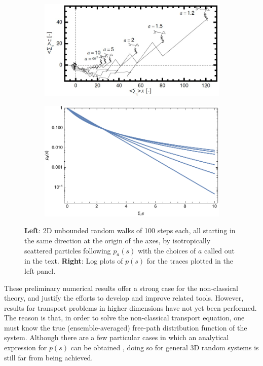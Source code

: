 \documentclass[12pt]{article}
\begin{document}
\begin{figure}[hbt]
    \centering
    \begin{subfigure}{0.49\textwidth}
        \centering
        \includegraphics[width=\textwidth]{fig4a.jpg}
    \end{subfigure}
        \begin{subfigure}{0.49\textwidth}
        \centering
        \includegraphics[width=\textwidth]{fig4b}
    \end{subfigure}
    \caption{\textbf{Left}: 2D unbounded random walks of 100 steps each, all starting in the same direction at the origin of the axes, by isotropically scattered particles following $p_a(s)$ with the choices of $a$ called out in the text. \textbf{Right}: Log plots of $p(s)$ for the traces plotted in the left panel.}\label{fig4}
\end{figure}

These preliminary numerical results offer a strong case for the non-classical theory, and justify the efforts to develop and improve related tools.
However, results for transport problems in higher dimensions have not yet been performed. The reason is that, in order to solve the non-classical transport equation, one must know the true (ensemble-averaged) free-path distribution function of the system.
Although there are a few particular cases in which an analytical expression for $p(s)$ can be obtained \cite{vaskry16,vassla16}, doing so for general 3D random systems is still far from being achieved.
\end{document}
